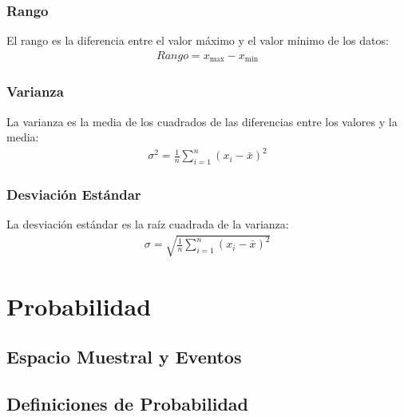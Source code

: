 \documentclass[a4paper]{report} %
\begin{document}
\subsubsection{Rango}
El rango es la diferencia entre el valor m\'aximo y el valor m\'inimo de los datos:
\begin{eqnarray*}
Rango = x_{\text{max}} - x_{\text{min}}
\end{eqnarray*}
\subsubsection{Varianza}
La varianza es la media de los cuadrados de las diferencias entre los valores y la media:
\begin{eqnarray*}
\sigma^2 = \frac{1}{n} \sum_{i=1}^{n} (x_i - \bar{x})^2
\end{eqnarray*}
\subsubsection{Desviaci\'on Est\'andar}
La desviaci\'on est\'andar es la ra\'iz cuadrada de la varianza:
\begin{eqnarray*}
\sigma = \sqrt{\frac{1}{n} \sum_{i=1}^{n} (x_i - \bar{x})^2}
\end{eqnarray*}


\section{Probabilidad}
\subsection{Espacio Muestral y Eventos}
\subsection{Definiciones de Probabilidad}
\end{document}
